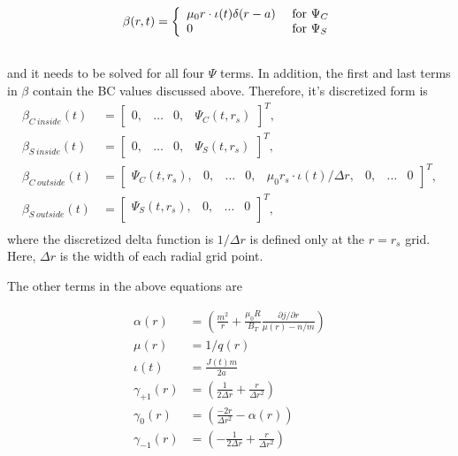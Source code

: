 \documentclass{article}
\begin{document}
\begin{equation} \label{eq:beta}
\begin{split}
\beta(r,t) &= \left\{
\begin{array}{l l}
\mu_0r \cdot \iota(t) \delta (r-a) & \text{ for } \Psi_C \\
0 & \text{ for } \Psi_S\\
\end{array} \right. \\\
\end{split}
\end{equation} 
and it needs to be solved for all four $\Psi$ terms.  In addition, the first and last terms in $\beta$ contain the BC values discussed above.  Therefore, it's discretized form is
\begin{equation} \label{eq:BVPAMatrix}
\begin{split}
\beta_{C \ inside}(t) &= 
\begin{bmatrix}
0,& \ldots &  0, & \Psi_{C}(t,r_s)
\end{bmatrix}^T, \\
\beta_{S \ inside}(t) &= 
\begin{bmatrix}
0,& \ldots &  0, & \Psi_{S}(t,r_s)
\end{bmatrix}^T, \\
\beta_{C \ outside}(t) &= 
\begin{bmatrix}
\Psi_{C}(t,r_s), & 0, & \ldots &0, &\mu_0r_s \cdot \iota(t)/\Delta r,  &0,&\ldots &  0 
\end{bmatrix}^T, \\
\beta_{S \ outside}(t) &= 
\begin{bmatrix}
\Psi_{S}(t,r_s), & 0, & \ldots &  0 \\
\end{bmatrix}^T, \\
\end{split}
\end{equation}
where the discretized delta function is $1/ \Delta r$ is defined only at the $r=r_s$ grid.  Here, $\Delta r$ is the width of each radial grid point.


The other terms in the above equations are

\begin{equation} \label{eq:BVPTerms}
\begin{split}
\alpha(r)&=\left( \frac{m^2}{r} +\frac{\mu_0 R}{B_T} \frac{\partial j / \partial r}{\mu(r)-n/m} \right) \\
\mu(r)&=1/q(r)\\
\iota(t) &= \frac{J(t)m}{2a} \\
  \gamma_{+1}(r) &=\left(\frac{1}{2 \Delta r}+\frac{r}{\Delta r^2 }\right) \\
  \gamma_{0}(r)& = \left( \frac{-2r}{\Delta r^2} -\alpha(r) \right)\\
  \gamma_{-1}(r)& = \left(-\frac{1}{2\Delta r} + \frac{r}{\Delta r^2} \right)
\end{split}
\end{equation}
\end{document}
